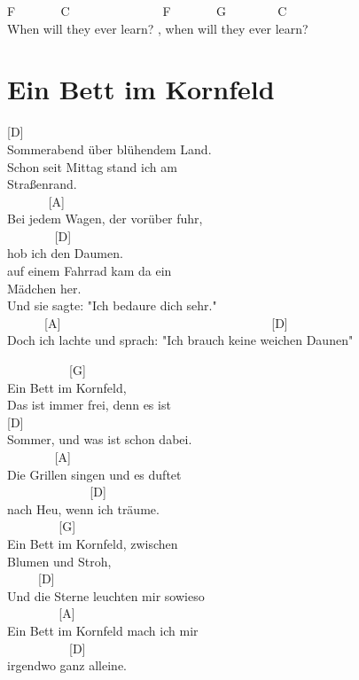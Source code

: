 \documentclass[
  letterpaper,
]{scrbook}
\begin{document}
F ~ ~ ~ ~ C ~ ~ ~ ~ ~ ~ ~ ~ ~F ~ ~ ~ ~ G ~ ~ ~ ~ ~C\\
When will they ever learn? , when will they ever learn?

\hypertarget{ein-bett-im-kornfeld}{%
\chapter{Ein Bett im Kornfeld}\label{ein-bett-im-kornfeld}}

{[}D{]}\\
Sommerabend über blühendem Land.\\
Schon seit Mittag stand ich am\\
Straßenrand.\\
\hspace*{0.333em} ~ ~ ~ ~ {[}A{]}\\
Bei jedem Wagen, der vorüber fuhr,\\
\hspace*{0.333em} ~ ~ ~ ~ ~{[}D{]}\\
hob ich den Daumen.\\
auf einem Fahrrad kam da ein\\
Mädchen her.\\
Und sie sagte: "Ich bedaure dich sehr."\\
\hspace*{0.333em} ~ ~ ~ ~{[}A{]} ~ ~ ~ ~ ~ ~ ~ ~ ~ ~ ~ ~ ~ ~ ~ ~ ~ ~ ~ ~
{[}D{]}\\
Doch ich lachte und sprach: "Ich brauch keine weichen Daunen"

~ ~ ~ ~ ~ ~ {[}G{]}\\
Ein Bett im Kornfeld,\\
Das ist immer frei, denn es ist\\
{[}D{]}\\
Sommer, und was ist schon dabei.\\
\hspace*{0.333em} ~ ~ ~ ~ ~{[}A{]}\\
Die Grillen singen und es duftet\\
\hspace*{0.333em} ~ ~ ~ ~ ~ ~ ~ ~ {[}D{]}\\
nach Heu, wenn ich träume.\\
\hspace*{0.333em} ~ ~ ~ ~ ~ {[}G{]}\\
Ein Bett im Kornfeld, zwischen\\
Blumen und Stroh,\\
\hspace*{0.333em} ~ ~ ~ {[}D{]}\\
Und die Sterne leuchten mir sowieso\\
\hspace*{0.333em} ~ ~ ~ ~ ~ {[}A{]}\\
Ein Bett im Kornfeld mach ich mir\\
\hspace*{0.333em} ~ ~ ~ ~ ~ ~ {[}D{]}\\
irgendwo ganz alleine.
\end{document}
